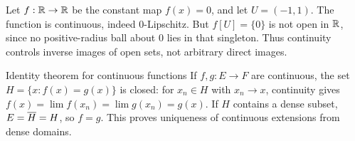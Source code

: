 \begin{answer}
Let $f:\mathbb R\to\mathbb R$ be the constant map $f(x)=0$, and let $U=(-1,1)$. The function is continuous, indeed $0$-Lipschitz. But $f[U]=\{0\}$ is not open in $\mathbb R$, since no positive-radius ball about $0$ lies in that singleton. Thus continuity controls inverse images of open sets, not arbitrary direct images.
\end{answer}
\begin{note}{Identity theorem for continuous functions}
If $f,g:E\to F$ are continuous, the set $H=\{x:f(x)=g(x)\}$ is closed: for $x_n\in H$ with $x_n\to x$, continuity gives $f(x)=\lim f(x_n)=\lim g(x_n)=g(x)$. If $H$ contains a dense subset, $E=\overline{H}=H$, so $f=g$. This proves uniqueness of continuous extensions from dense domains.
\end{note}


